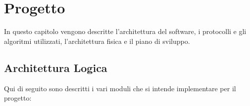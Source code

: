 
\chapter{Progetto} \label{progetto}

In questo capitolo vengono descritte l'architettura del software, i protocolli e gli algoritmi utilizzati, l'architettura fisica e il piano di sviluppo.

\section{Architettura Logica}

Qui di seguito sono descritti i vari moduli che si intende implementare per il progetto:

